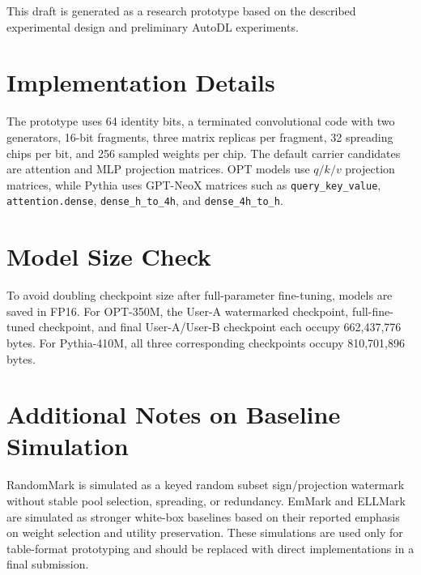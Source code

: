 \documentclass[sigconf]{acmart}
\begin{document}
\begin{acks}
This draft is generated as a research prototype based on the described experimental design and preliminary AutoDL experiments.
\end{acks}

\appendix

\section{Implementation Details}
The prototype uses 64 identity bits, a terminated convolutional code with two generators, 16-bit fragments, three matrix replicas per fragment, 32 spreading chips per bit, and 256 sampled weights per chip. The default carrier candidates are attention and MLP projection matrices. OPT models use $q/k/v$ projection matrices, while Pythia uses GPT-NeoX matrices such as \texttt{query\_key\_value}, \texttt{attention.dense}, \texttt{dense\_h\_to\_4h}, and \texttt{dense\_4h\_to\_h}.

\section{Model Size Check}
To avoid doubling checkpoint size after full-parameter fine-tuning, models are saved in FP16. For OPT-350M, the User-A watermarked checkpoint, full-fine-tuned checkpoint, and final User-A/User-B checkpoint each occupy 662,437,776 bytes. For Pythia-410M, all three corresponding checkpoints occupy 810,701,896 bytes.

\section{Additional Notes on Baseline Simulation}
RandomMark is simulated as a keyed random subset sign/projection watermark without stable pool selection, spreading, or redundancy. EmMark and ELLMark are simulated as stronger white-box baselines based on their reported emphasis on weight selection and utility preservation. These simulations are used only for table-format prototyping and should be replaced with direct implementations in a final submission.



\end{document}

